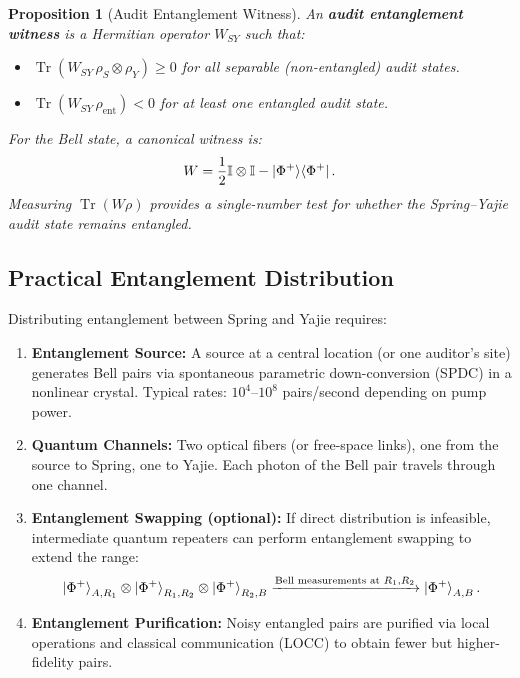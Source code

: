 \documentclass[11pt,a4paper]{article}
\theoremstyle{plain}
\newtheorem{proposition}[theorem]{Proposition}
\theoremstyle{definition}
\theoremstyle{remark}
\DeclareMathOperator{\Tr}{Tr}
\newcommand{\id}{\mathbb{I}}
\newcommand{\ketbra}[2]{\ket{#1}\!\bra{#2}}
\begin{document}
\begin{proposition}[Audit Entanglement Witness]
\label{prop:ent_witness}
An \textbf{audit entanglement witness} is a Hermitian operator $W_{SY}$ such that:
\begin{itemize}
  \item $\Tr(W_{SY} \, \rho_S \otimes \rho_Y) \geq 0$ for all separable
        (non-entangled) audit states.
  \item $\Tr(W_{SY} \, \rho_{\text{ent}}) < 0$ for at least one entangled
        audit state.
\end{itemize}
For the Bell state, a canonical witness is:
\[
W = \frac{1}{2}\id \otimes \id - \ketbra{\Phi^+}{\Phi^+}.
\]
Measuring $\Tr(W \rho)$ provides a single-number test for whether the
Spring--Yajie audit state remains entangled.
\end{proposition}

\subsection{Practical Entanglement Distribution}
\label{sec:ent_distribution}

Distributing entanglement between Spring and Yajie requires:

\begin{enumerate}[label=(\arabic*)]
  \item \textbf{Entanglement Source:} A source at a central location
        (or one auditor's site) generates Bell pairs via spontaneous
        parametric down-conversion (SPDC) in a nonlinear crystal.
        Typical rates: $10^4$--$10^8$ pairs/second depending on pump power.
  
  \item \textbf{Quantum Channels:} Two optical fibers (or free-space links),
        one from the source to Spring, one to Yajie. Each photon of the
        Bell pair travels through one channel.
  
  \item \textbf{Entanglement Swapping (optional):} If direct distribution
        is infeasible, intermediate quantum repeaters can perform
        entanglement swapping to extend the range:
        \[
        \ket{\Phi^+}_{A,R_1} \otimes \ket{\Phi^+}_{R_1,R_2} \otimes
        \ket{\Phi^+}_{R_2,B}
        \xrightarrow{\text{Bell measurements at } R_1, R_2}
        \ket{\Phi^+}_{A,B}.
        \]
  
  \item \textbf{Entanglement Purification:} Noisy entangled pairs are
        purified via local operations and classical communication (LOCC)
        to obtain fewer but higher-fidelity pairs.
\end{enumerate}
\end{document}
